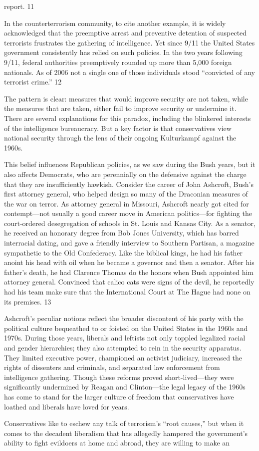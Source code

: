 report. {\color{blue} 11 } {\par} In the counterterrorism community, to cite another example, it is widely acknowledged that the preemptive arrest and preventive detention of suspected terrorists frustrates the gathering of intelligence. Yet since 9/11 the United States government consistently has relied on such policies. In the two years following 9/11, federal authorities preemptively rounded up more than 5,000 foreign nationals. As of 2006 not a single one of those individuals stood “convicted of any terrorist crime.” {\color{blue} 12 } {\par} The pattern is clear: measures that would improve security are not taken, while the measures that are taken, either fail to improve security or undermine it. There are several explanations for this paradox, including the blinkered interests of the intelligence bureaucracy. But a key factor is that conservatives view national security through the lens of their ongoing Kulturkampf against the 1960s.{\par} This belief influences Republican policies, as we saw during the Bush years, but it also affects Democrats, who are perennially on the defensive against the charge that they are insufficiently hawkish. Consider the career of John Ashcroft, Bush’s first attorney general, who helped design so many of the Draconian measures of the war on terror. As attorney general in Missouri, Ashcroft nearly got cited for contempt—not usually a good career move in American politics—for fighting the court-ordered desegregation of schools in St. Louis and Kansas City. As a senator, he received an honorary degree from Bob Jones University, which has barred interracial dating, and gave a friendly interview to Southern Partisan, a magazine sympathetic to the Old Confederacy. Like the biblical kings, he had his father anoint his head with oil when he became a governor and then a senator. After his father’s death, he had Clarence Thomas do the honors when Bush appointed him attorney general. Convinced that calico cats were signs of the devil, he reportedly had his team make sure that the International Court at The Hague had none on its premises. {\color{blue} 13 } {\par} Ashcroft’s peculiar notions reflect the broader discontent of his party with the political culture bequeathed to or foisted on the United States in the 1960s and 1970s. During those years, liberals and leftists not only toppled legalized racial and gender hierarchies; they also attempted to rein in the security apparatus. They limited executive power, championed an activist judiciary, increased the rights of dissenters and criminals, and separated law enforcement from intelligence gathering. Though these reforms proved short-lived—they were significantly undermined by Reagan and Clinton—the legal legacy of the 1960s has come to stand for the larger culture of freedom that conservatives have loathed and liberals have loved for years.{\par} Conservatives like to eschew any talk of terrorism’s “root causes,” but when it comes to the decadent liberalism that has allegedly hampered the government’s ability to fight evildoers at home and abroad, they are willing to make an 